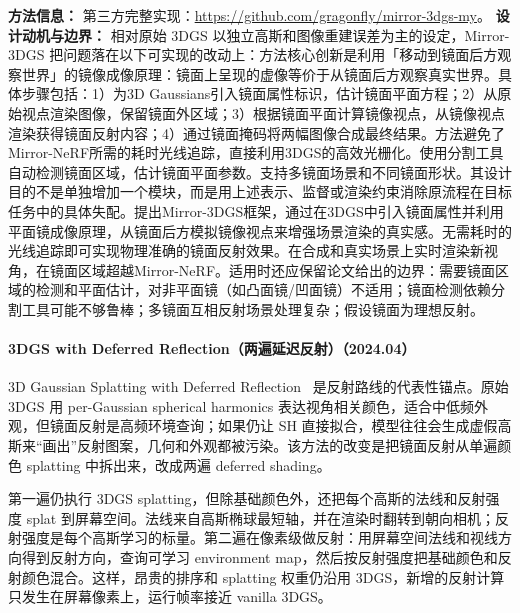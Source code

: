 \textbf{方法信息：} 第三方完整实现：\url{https://github.com/gragonfly/mirror-3dgs-my}。
\textbf{设计动机与边界：} 相对原始 3DGS 以独立高斯和图像重建误差为主的设定，Mirror-3DGS 把问题落在以下可实现的改动上：方法核心创新是利用「移动到镜面后方观察世界」的镜像成像原理：镜面上呈现的虚像等价于从镜面后方观察真实世界。具体步骤包括：1）为3D Gaussians引入镜面属性标识，估计镜面平面方程；2）从原始视点渲染图像，保留镜面外区域；3）根据镜面平面计算镜像视点，从镜像视点渲染获得镜面反射内容；4）通过镜面掩码将两幅图像合成最终结果。方法避免了Mirror-NeRF所需的耗时光线追踪，直接利用3DGS的高效光栅化。使用分割工具自动检测镜面区域，估计镜面平面参数。支持多镜面场景和不同镜面形状。其设计目的不是单独增加一个模块，而是用上述表示、监督或渲染约束消除原流程在目标任务中的具体失配。提出Mirror-3DGS框架，通过在3DGS中引入镜面属性并利用平面镜成像原理，从镜面后方模拟镜像视点来增强场景渲染的真实感。无需耗时的光线追踪即可实现物理准确的镜面反射效果。在合成和真实场景上实时渲染新视角，在镜面区域超越Mirror-NeRF。适用时还应保留论文给出的边界：需要镜面区域的检测和平面估计，对非平面镜（如凸面镜/凹面镜）不适用；镜面检测依赖分割工具可能不够鲁棒；多镜面互相反射场景处理复杂；假设镜面为理想反射。
\paragraph{3DGS with Deferred Reflection（两遍延迟反射）（2024.04）}
3D Gaussian Splatting with Deferred Reflection~\cite{2404_18454} 是反射路线的代表性锚点。原始 3DGS 用 per-Gaussian spherical harmonics 表达视角相关颜色，适合中低频外观，但镜面反射是高频环境查询；如果仍让 SH 直接拟合，模型往往会生成虚假高斯来“画出”反射图案，几何和外观都被污染。该方法的改变是把镜面反射从单遍颜色 splatting 中拆出来，改成两遍 deferred shading。

第一遍仍执行 3DGS splatting，但除基础颜色外，还把每个高斯的法线和反射强度 splat 到屏幕空间。法线来自高斯椭球最短轴，并在渲染时翻转到朝向相机；反射强度是每个高斯学习的标量。第二遍在像素级做反射：用屏幕空间法线和视线方向得到反射方向，查询可学习 environment map，然后按反射强度把基础颜色和反射颜色混合。这样，昂贵的排序和 splatting 权重仍沿用 3DGS，新增的反射计算只发生在屏幕像素上，运行帧率接近 vanilla 3DGS。

